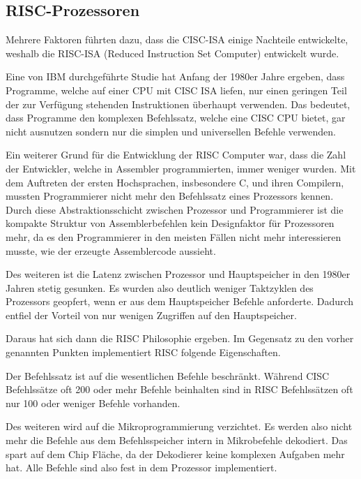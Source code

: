 \documentclass[12pt]{article}
\begin{document}
\subsection{RISC-Prozessoren}
Mehrere Faktoren führten dazu, dass die CISC-ISA einige Nachteile entwickelte, weshalb die RISC-ISA (Reduced Instruction Set Computer) entwickelt wurde.


Eine von IBM durchgeführte Studie hat Anfang der 1980er Jahre ergeben, dass Programme, welche auf einer CPU mit CISC ISA liefen, nur einen geringen Teil der zur Verfügung stehenden Instruktionen überhaupt verwenden. Das bedeutet, dass Programme den komplexen Befehlssatz, welche eine CISC CPU bietet, gar nicht ausnutzen sondern nur die simplen und universellen Befehle verwenden. 

Ein weiterer Grund für die Entwicklung der RISC Computer war, dass die Zahl der Entwickler, welche in Assembler programmierten, immer weniger wurden. Mit dem Auftreten der ersten Hochsprachen, insbesondere C, und ihren Compilern, mussten Programmierer nicht mehr den Befehlssatz eines Prozessors kennen. Durch diese Abstraktionsschicht zwischen Prozessor und Programmierer ist die kompakte Struktur von Assemblerbefehlen kein Designfaktor für Prozessoren mehr, da es den Programmierer in den meisten Fällen nicht mehr interessieren musste, wie der erzeugte Assemblercode aussieht.

Des weiteren ist die Latenz zwischen Prozessor und Hauptspeicher in den 1980er Jahren stetig gesunken. Es wurden also deutlich weniger Taktzyklen des Prozessors geopfert, wenn er aus dem Hauptspeicher Befehle anforderte. Dadurch entfiel der Vorteil von nur wenigen Zugriffen auf den Hauptspeicher.

\noindent
Daraus hat sich dann die RISC Philosophie ergeben. Im Gegensatz zu den vorher genannten Punkten implementiert RISC folgende Eigenschaften.

Der Befehlssatz ist auf die wesentlichen Befehle beschränkt. Während CISC Befehlssätze oft 200 oder mehr Befehle beinhalten sind in RISC Befehlssätzen oft nur 100 oder weniger Befehle vorhanden.

Des weiteren wird auf die Mikroprogrammierung verzichtet. Es werden also nicht mehr die Befehle aus dem Befehlsspeicher intern in Mikrobefehle dekodiert. Das spart auf dem Chip Fläche, da der Dekodierer keine komplexen Aufgaben mehr hat. Alle Befehle sind also fest in dem Prozessor implementiert.
\end{document}
